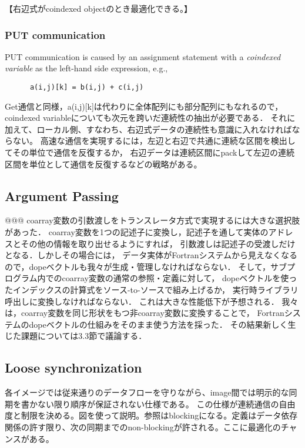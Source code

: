 【右辺式がcoindexed objectのとき最適化できる。】


\subsubsection{PUT communication}

PUT communication is caused by an assignment statement with a {\em coindexed variable} 
as the left-hand side expression, e.g.,
\begin{verbatim}
      a(i,j)[k] = b(i,j) + c(i,j)
\end{verbatim}

Get通信と同様，a(i,j)[k]は代わりに全体配列にも部分配列にもなれるので，
coindexed variableについても次元を跨いだ連続性の抽出が必要である．
それに加えて、ローカル側、すなわち、右辺式データの連続性も意識に入れなければならない。
高速な通信を実現するには，左辺と右辺で共通に連続な区間を検出してその単位で通信を反復するか，
右辺データは連続区間にpackして左辺の連続区間を単位として通信を反復するなどの戦略がある。



\subsection{Argument Passing}
@@@
coarray変数の引数渡しをトランスレータ方式で実現するには大きな選択肢があった．
coarray変数を1つの記述子に変換し，記述子を通して実体のアドレスとその他の情報を取り出せるようにすれば，
引数渡しは記述子の受渡しだけとなる．しかしその場合には，
データ実体がFortranシステムから見えなくなるので，dopeベクトルも我々が生成・管理しなければならない．
そして，サブプログラム内でのcoarray変数の通常の参照・定義に対して，
dopeベクトルを使ったインデックスの計算式をソース-to-ソースで組み上げるか，
実行時ライブラリ呼出しに変換しなければならない．
これは大きな性能低下が予想される．
我々は，coarray変数を同じ形状をもつ非coarray変数に変換することで，
Fortranシステムのdopeベクトルの仕組みをそのまま使う方法を採った．
その結果新しく生じた課題については3.3節で議論する．


\subsection{Loose synchronization}
各イメージでは従来通りのデータフローを守りながら、image間では明示的な同期を書かない限り順序が保証されない仕様である。
この仕様が連続通信の自由度と制限を決める。図を使って説明。参照はblockingになる。定義はデータ依存関係の許す限り、次の同期までのnon-blockingが許される。ここに最適化のチャンスがある。


